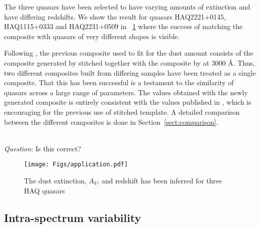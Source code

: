 \documentclass{aa}    %
\newcommand{\figref}[1]{\ref{fig:#1}}
\newcommand{\Fig}[1]{\figurename~\figref{#1}}
\newcommand{\fig}[1]{\Fig{#1}}
\newcommand{\figlabel}[1]{\label{fig:#1}}
\newcommand{\sectionname}{Section}
\newcommand{\Sect}[1]{\sectionname~\ref{sect:#1}}
\newcommand{\sect}[1]{\Sect{#1}}
\newcommand{\sectlabel}[1]{\label{sect:#1}}
\newcommand{\todo}[3]{{\color{#2}\emph{#1}: #3}}
\newcommand{\qtodo}[1]{\todo{\\ Question}{red}{#1}}
\begin{document}
The three quasars have been selected to have varying amounts of extinction and have differing redshifts. We show the result for quasars HAQ2221+0145, HAQ1115+0333 and HAQ2231+0509 in \fig{application} where the success of matching the composite with quasars of very different shapes is visible. 

Following \cite{Wang2012}, the previous composite used to fit for the dust amount consists of the composite generated by \cite{VandenBerk2001} stitched together with the composite by \cite{Glikman2006} at 3000 \AA. Thus, two different composites built from differing samples have been treated as a single composite. That this has been successful is a testament to the similarity of quasars across a large range of parameters. 
The values obtained with the newly generated composite is entirely consistent with the values published in \cite{Krogager2015}, which is encouraging for the previous use of stitched template. A detailed comparison between the different composites is done in \sect{comparison}.



 \qtodo{Is this correct?}
 
 
  
   \begin{figure}[hbtp]
     \centering
     \texttt{[image: Figs/application.pdf]}
     \caption[]{The dust extinction, $A_V$, and redshift has been inferred for three HAQ quasars}
     \figlabel{application}
   \end{figure}
 
 
 \subsection{Intra-spectrum variability}  \sectlabel{variability}
 
\end{document}
